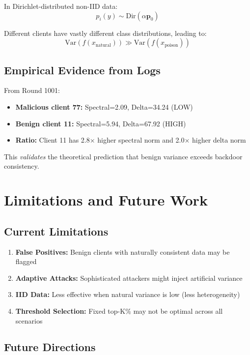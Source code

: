 \documentclass[11pt,a4paper]{article}
\begin{document}
In Dirichlet-distributed non-IID data:
\[
p_i(y) \sim \text{Dir}(\alpha \mathbf{p}_0)
\]

Different clients have vastly different class distributions, leading to:
\[
\text{Var}(f(x_{\text{natural}})) \gg \text{Var}(f(x_{\text{poison}}))
\]

\subsection{Empirical Evidence from Logs}

From Round 1001:
\begin{itemize}
    \item \textbf{Malicious client 77:} Spectral=2.09, Delta=34.24 (LOW)
    \item \textbf{Benign client 11:} Spectral=5.94, Delta=67.92 (HIGH)
    \item \textbf{Ratio:} Client 11 has 2.8× higher spectral norm and 2.0× higher delta norm
\end{itemize}

This \emph{validates} the theoretical prediction that benign variance exceeds backdoor consistency.

\section{Limitations and Future Work}

\subsection{Current Limitations}

\begin{enumerate}
    \item \textbf{False Positives:} Benign clients with naturally consistent data may be flagged
    \item \textbf{Adaptive Attacks:} Sophisticated attackers might inject artificial variance
    \item \textbf{IID Data:} Less effective when natural variance is low (less heterogeneity)
    \item \textbf{Threshold Selection:} Fixed top-K\% may not be optimal across all scenarios
\end{enumerate}

\subsection{Future Directions}
\end{document}
